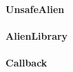 \documentclass[a4paper,10pt,twoside]{book}
\begin{document}
\paragraph{UnsafeAlien}

% 

\paragraph{AlienLibrary}

\paragraph{Callback}
% 
% 
\end{document}
